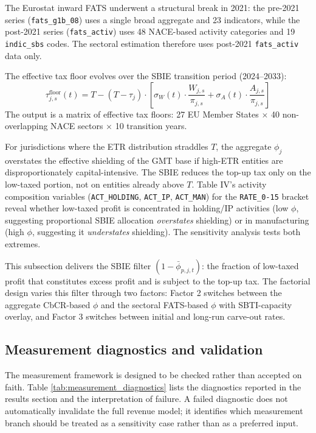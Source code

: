 \documentclass[11pt,a4paper]{article}
\newcommand{\code}[1]{\texttt{#1}}
\begin{document}
The Eurostat inward FATS underwent a structural break in 2021: the pre-2021 series (\code{fats\_g1b\_08}) uses a single broad aggregate and 23 indicators, while the post-2021 series (\code{fats\_activ}) uses 48 NACE-based activity categories and 19 \code{indic\_sbs} codes. The sectoral estimation therefore uses post-2021 \code{fats\_activ} data only.

The effective tax floor evolves over the SBIE transition period (2024--2033):
\begin{equation}\label{eq:floor_transition}
\tau_{j,s}^{\text{floor}}(t) = T - (T - \tau_j) \cdot \left[\sigma_W(t) \cdot \frac{W_{j,s}}{\pi_{j,s}} + \sigma_A(t) \cdot \frac{A_{j,s}}{\pi_{j,s}}\right]
\end{equation}
The output is a matrix of effective tax floors: 27 EU Member States $\times$ 40 non-overlapping NACE sectors $\times$ 10 transition years.

For jurisdictions where the ETR distribution straddles $T$, the aggregate $\phi_j$ overstates the effective shielding of the GMT base if high-ETR entities are disproportionately capital-intensive. The SBIE reduces the top-up tax only on the low-taxed portion, not on entities already above $T$. Table IV's activity composition variables (\code{ACT\_HOLDING}, \code{ACT\_IP}, \code{ACT\_MAN}) for the \code{RATE\_0-15} bracket reveal whether low-taxed profit is concentrated in holding/IP activities (low $\phi$, suggesting proportional SBIE allocation \emph{overstates} shielding) or in manufacturing (high $\phi$, suggesting it \emph{understates} shielding). The sensitivity analysis tests both extremes.

This subsection delivers the SBIE filter $(1 - \bar{\phi}_{p,j,t})$: the fraction of low-taxed profit that constitutes excess profit and is subject to the top-up tax. The factorial design varies this filter through two factors: Factor 2 switches between the aggregate CbCR-based $\phi$ and the sectoral FATS-based $\phi$ with SBTI-capacity overlay, and Factor 3 switches between initial and long-run carve-out rates.

\subsection{Measurement diagnostics and validation}\label{sec:measurement_validation}

The measurement framework is designed to be checked rather than accepted on faith. Table \ref{tab:measurement_diagnostics} lists the diagnostics reported in the results section and the interpretation of failure. A failed diagnostic does not automatically invalidate the full revenue model; it identifies which measurement branch should be treated as a sensitivity case rather than as a preferred input.
\end{document}
